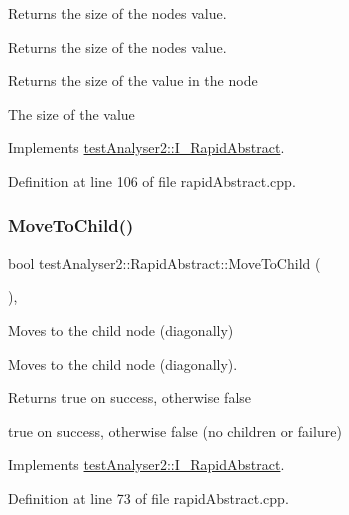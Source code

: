 Returns the size of the nodes value. 

Returns the size of the node\textquotesingle{}s value.

\begin{DoxyReturn}{Returns}
the size of the value in the node

The size of the value 
\end{DoxyReturn}


Implements \mbox{\hyperlink{classtestAnalyser2_1_1I__RapidAbstract_ad30a0a18d8a387ab48c95270b70042b4}{test\+Analyser2\+::\+I\+\_\+\+Rapid\+Abstract}}.



Definition at line 106 of file rapid\+Abstract.\+cpp.

\mbox{\label{classtestAnalyser2_1_1RapidAbstract_af54437d66d9120ab274569efa1a51873}} 
\subsubsection{\texorpdfstring{MoveToChild()}{MoveToChild()}}
{\footnotesize\ttfamily bool test\+Analyser2\+::\+Rapid\+Abstract\+::\+Move\+To\+Child (\begin{DoxyParamCaption}{ }\end{DoxyParamCaption})\hspace{0.3cm}{\ttfamily [override]}, {\ttfamily [virtual]}}



Moves to the child node (diagonally) 

Moves to the child node (diagonally).

\begin{DoxyReturn}{Returns}
true on success, otherwise false

true on success, otherwise false (no children or failure) 
\end{DoxyReturn}


Implements \mbox{\hyperlink{classtestAnalyser2_1_1I__RapidAbstract_a9d646b222f88e3baf52ca808288bc7c2}{test\+Analyser2\+::\+I\+\_\+\+Rapid\+Abstract}}.



Definition at line 73 of file rapid\+Abstract.\+cpp.

\mbox{\label{classtestAnalyser2_1_1RapidAbstract_a406f500d326f20c768abffb9e6318616}} 
